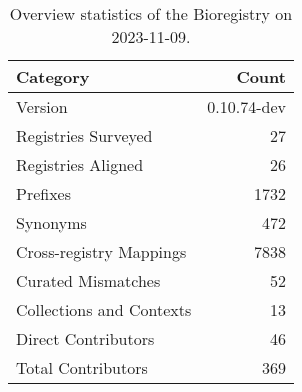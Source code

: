\begin{table}
\caption{Overview statistics of the Bioregistry on 2023-11-09.}
\label{tab:bioregistry-summary}
\begin{tabular}{lr}
\toprule
Category & Count \\
\midrule
Version & 0.10.74-dev \\
Registries Surveyed & 27 \\
Registries Aligned & 26 \\
Prefixes & 1732 \\
Synonyms & 472 \\
Cross-registry Mappings & 7838 \\
Curated Mismatches & 52 \\
Collections and Contexts & 13 \\
Direct Contributors & 46 \\
Total Contributors & 369 \\
\bottomrule
\end{tabular}
\end{table}
